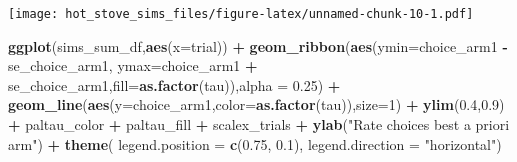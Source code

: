 \documentclass[
]{article}
\newenvironment{Shaded}{\begin{snugshade}}{\end{snugshade}}
\newcommand{\AttributeTok}[1]{\textcolor[rgb]{0.13,0.29,0.53}{#1}}
\newcommand{\DecValTok}[1]{\textcolor[rgb]{0.00,0.00,0.81}{#1}}
\newcommand{\FloatTok}[1]{\textcolor[rgb]{0.00,0.00,0.81}{#1}}
\newcommand{\FunctionTok}[1]{\textcolor[rgb]{0.13,0.29,0.53}{\textbf{#1}}}
\newcommand{\NormalTok}[1]{#1}
\newcommand{\SpecialCharTok}[1]{\textcolor[rgb]{0.81,0.36,0.00}{\textbf{#1}}}
\newcommand{\StringTok}[1]{\textcolor[rgb]{0.31,0.60,0.02}{#1}}
\begin{document}
\texttt{[image: hot\_stove\_sims\_files/figure-latex/unnamed-chunk-10-1.pdf]}

\begin{Shaded}
\begin{Highlighting}[]
\FunctionTok{ggplot}\NormalTok{(sims\_sum\_df,}\FunctionTok{aes}\NormalTok{(}\AttributeTok{x=}\NormalTok{trial)) }\SpecialCharTok{+}
  \FunctionTok{geom\_ribbon}\NormalTok{(}\FunctionTok{aes}\NormalTok{(}\AttributeTok{ymin=}\NormalTok{choice\_arm1 }\SpecialCharTok{{-}}\NormalTok{ se\_choice\_arm1, }\AttributeTok{ymax=}\NormalTok{choice\_arm1 }\SpecialCharTok{+}\NormalTok{ se\_choice\_arm1,}\AttributeTok{fill=}\FunctionTok{as.factor}\NormalTok{(tau)),}\AttributeTok{alpha =} \FloatTok{0.25}\NormalTok{) }\SpecialCharTok{+}
  \FunctionTok{geom\_line}\NormalTok{(}\FunctionTok{aes}\NormalTok{(}\AttributeTok{y=}\NormalTok{choice\_arm1,}\AttributeTok{color=}\FunctionTok{as.factor}\NormalTok{(tau)),}\AttributeTok{size=}\DecValTok{1}\NormalTok{) }\SpecialCharTok{+} 
  \FunctionTok{ylim}\NormalTok{(}\FloatTok{0.4}\NormalTok{,}\FloatTok{0.9}\NormalTok{) }\SpecialCharTok{+} 
\NormalTok{  paltau\_color }\SpecialCharTok{+} 
\NormalTok{  paltau\_fill }\SpecialCharTok{+} 
\NormalTok{  scalex\_trials }\SpecialCharTok{+}
  \FunctionTok{ylab}\NormalTok{(}\StringTok{"Rate choices best a priori arm"}\NormalTok{) }\SpecialCharTok{+}
  \FunctionTok{theme}\NormalTok{(}
    \AttributeTok{legend.position =} \FunctionTok{c}\NormalTok{(}\FloatTok{0.75}\NormalTok{, }\FloatTok{0.1}\NormalTok{),}
    \AttributeTok{legend.direction =} \StringTok{"horizontal"}\NormalTok{)}
\end{Highlighting}
\end{Shaded}
\end{document}

